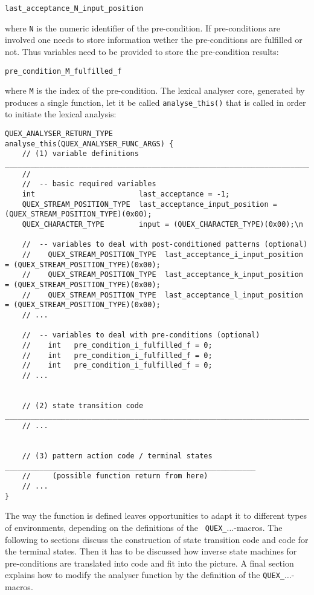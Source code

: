     \begin{center}    
	{\tt last\_acceptance\_N\_input\_position}
    \end{center}

    where {\tt N} is the numeric identifier of the pre-condition.
    If pre-conditions are involved one needs to store information wether the pre-conditions
    are fulfilled or not. Thus variables need to be provided to store the pre-condition
    results:    

    \begin{center}{\tt pre\_condition\_M\_fulfilled\_f}
    \end{center}
    
    where {\tt M} is the index of the pre-condition.
    The lexical analyser core, generated by \quex produces a single function, let it be
    called {\tt analyse\_this()} that is called in order to initiate the lexical
    analysis: 
    
    
\begin{lstlisting}
QUEX_ANALYSER_RETURN_TYPE
analyse_this(QUEX_ANALYSER_FUNC_ARGS) {
    // (1) variable definitions ___________________________________________________________________________
    //
    //  -- basic required variables
    int                        last_acceptance = -1;
    QUEX_STREAM_POSITION_TYPE  last_acceptance_input_position = (QUEX_STREAM_POSITION_TYPE)(0x00);
    QUEX_CHARACTER_TYPE        input = (QUEX_CHARACTER_TYPE)(0x00);\n

    //  -- variables to deal with post-conditioned patterns (optional)
    //    QUEX_STREAM_POSITION_TYPE  last_acceptance_i_input_position = (QUEX_STREAM_POSITION_TYPE)(0x00);
    //    QUEX_STREAM_POSITION_TYPE  last_acceptance_k_input_position = (QUEX_STREAM_POSITION_TYPE)(0x00);
    //    QUEX_STREAM_POSITION_TYPE  last_acceptance_l_input_position = (QUEX_STREAM_POSITION_TYPE)(0x00);
    // ...	

    //  -- variables to deal with pre-conditions (optional)	
    //    int   pre_condition_i_fulfilled_f = 0;
    //    int   pre_condition_i_fulfilled_f = 0;
    //    int   pre_condition_i_fulfilled_f = 0;
    // ...	

	
    // (2) state transition code  _________________________________________________________________________
    // ...
    	
	
    // (3) pattern action code / terminal states __________________________________________________________
    // 	   (possible function return from here)
    // ...	
}    
\end{lstlisting}    

The way the function is defined leaves opportunities to adapt it to different
types of environments, depending on the definitions of the {\tt
    QUEX\_$\ldots$}-macros.  The following to sections discuss the construction
    of state transition code and code for the terminal states. Then it has to
    be discussed how inverse state machines for pre-conditions are translated
    into code and fit into the picture. A final section explains how to modify
    the analyser function by the definition of the {\tt QUEX\_$\ldots$}-macros.

    
